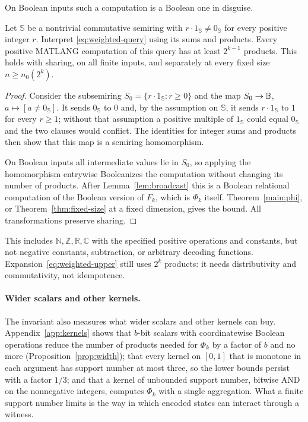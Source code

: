 On Boolean inputs such a computation is a Boolean one in disguise.
\begin{corollary}\label{cor:positive}
Let $\mathbb S$ be a nontrivial commutative semiring with
$r\cdot1_{\mathbb S}\ne0_{\mathbb S}$ for every positive integer $r$.
Interpret \eqref{eq:weighted-query} using its sums and products. Every
positive MATLANG computation of this query has at least $2^{k-1}$ products.
This holds with sharing, on all finite inputs, and separately at every fixed
size $n\ge n_0(2^k)$.
\end{corollary}
\begin{proof}
Consider the subsemiring $S_0=\{r\cdot1_{\mathbb S}:r\ge0\}$ and the map
$S_0\to\mathbb B$, $a\mapsto[a\ne0_{\mathbb S}]$. It sends $0_{\mathbb S}$ to
$0$ and, by the assumption on $\mathbb S$, it sends $r\cdot1_{\mathbb S}$ to
$1$ for every $r\ge1$; without that assumption a positive multiple of
$1_{\mathbb S}$ could equal $0_{\mathbb S}$ and the two clauses would
conflict. The identities for integer sums and products then show that this
map is a semiring homomorphism.

On Boolean inputs all intermediate values lie in $S_0$, so applying the
homomorphism entrywise Booleanizes the computation without changing its
number of products. After Lemma~\ref{lem:broadcast} this is a Boolean
relational computation of the Boolean version of $F_k$, which is $\Phi_k$
itself. Theorem~\ref{main:phi}, or Theorem~\ref{thm:fixed-size} at a fixed
dimension, gives the bound. All transformations preserve sharing.
\end{proof}
This includes $\mathbb N,\mathbb Z,\mathbb R,\mathbb C$ with the specified
positive operations and constants, but not negative constants, subtraction,
or arbitrary decoding functions. Expansion~\eqref{eq:weighted-upper} still
uses $2^k$ products: it needs distributivity and commutativity, not
idempotence.

\paragraph{Wider scalars and other kernels.}
The invariant also measures what wider scalars and other kernels can buy.
Appendix~\ref{app:kernels} shows that $b$-bit scalars with coordinatewise
Boolean operations reduce the number of products needed for $\Phi_k$ by a
factor of $b$ and no more (Proposition~\ref{prop:width}); that every kernel
on $[0,1]$ that is monotone in each argument has support number at most
three, so the lower bounds persist with a factor $1/3$; and that a kernel of
unbounded support number, bitwise AND on the nonnegative integers, computes
$\Phi_k$ with a single aggregation. What a finite support number limits is
the way in which encoded states can interact through a witness.
